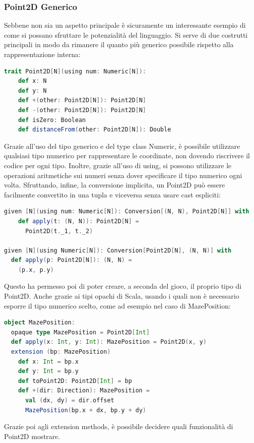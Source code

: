 \subsubsection{Point2D Generico}
Sebbene non sia un aspetto principale è sicuramente un interessante esempio di come si possano
sfruttare le potenzialità del linguaggio. Si serve di due costrutti principali in modo da rimanere
il quanto più generico possibile rispetto alla rappresentazione interna:
\begin{lstlisting}[language=Scala]
trait Point2D[N](using num: Numeric[N]):
    def x: N
    def y: N
    def +(other: Point2D[N]): Point2D[N]
    def -(other: Point2D[N]): Point2D[N]
    def isZero: Boolean
    def distanceFrom(other: Point2D[N]): Double
\end{lstlisting}
Grazie all'uso del tipo generico e del type class Numeric, è possibile
utilizzare qualsiasi tipo numerico per rappresentare le coordinate, non dovendo riscrivere 
il codice per ogni tipo. Inoltre, grazie all'uso di using, si possono utilizzare le operazioni 
aritmetiche sui numeri senza dover specificare il tipo numerico ogni volta.
Sfruttando, infine, la conversione implicita, un Point2D può essere facilmente convertito in una 
tupla e viceversa senza usare cast espliciti:
\begin{lstlisting}[language=Scala]
given [N](using num: Numeric[N]): Conversion[(N, N), Point2D[N]] with
    def apply(t: (N, N)): Point2D[N] =
      Point2D(t._1, t._2)

given [N](using Numeric[N]): Conversion[Point2D[N], (N, N)] with
  def apply(p: Point2D[N]): (N, N) =
    (p.x, p.y)
\end{lstlisting}
Questo ha permesso poi di poter creare, a seconda del gioco, il proprio tipo di Point2D. Anche
grazie ai tipi opachi di Scala, usando i quali non è necessario esporre il tipo numerico scelto, 
come ad esempio nel caso di MazePosition:
\begin{lstlisting}[language=Scala]
object MazePosition:
  opaque type MazePosition = Point2D[Int]
  def apply(x: Int, y: Int): MazePosition = Point2D(x, y)
  extension (bp: MazePosition)
    def x: Int = bp.x
    def y: Int = bp.y
    def toPoint2D: Point2D[Int] = bp
    def +(dir: Direction): MazePosition =
      val (dx, dy) = dir.offset
      MazePosition(bp.x + dx, bp.y + dy)
\end{lstlisting}
Grazie poi agli extension methods, è possibile decidere quali funzionalità di Point2D mostrare.


